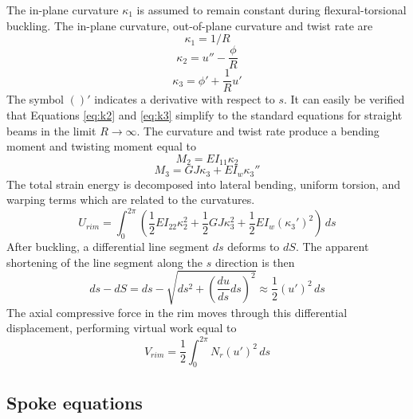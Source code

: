 \documentclass{bmd2016p}
\begin{document}
The in-plane curvature $\kappa_1$ is assumed to remain constant during flexural-torsional buckling. The in-plane curvature, out-of-plane curvature and twist rate are
\begin{equation}\label{eq:k1}
\kappa_1 = 1/R
\end{equation}
\begin{equation}\label{eq:k2}
\kappa_2 = u'' - \frac{\phi}{R}
\end{equation}
\begin{equation}\label{eq:k3}
\kappa_3 = \phi' + \frac{1}{R} u'
\end{equation}
The symbol $()'$ indicates a derivative with respect to $s$. It can easily be verified that Equations \ref{eq:k2} and \ref{eq:k3} simplify to the standard equations for straight beams in the limit $R\rightarrow \infty$. The curvature and twist rate produce a bending moment and twisting moment equal to
\begin{equation}\label{eq:M2}
M_2 = EI_{11} \kappa_2
\end{equation}
\begin{equation}\label{eq:M3}
M_3 = GJ \kappa_3 + EI_w \kappa_3''
\end{equation}
The total strain energy is decomposed into lateral bending, uniform torsion, and warping terms which are related to the curvatures.
\begin{equation}\label{eq:Urim}
U_{rim} = \int_0^{2\pi} \left( \frac{1}{2} EI_{22} \kappa_2^2 + \frac{1}{2} GJ \kappa_3^2 + \frac{1}{2} EI_w (\kappa_3')^2 \right)\, ds
\end{equation}
After buckling, a differential line segment $ds$ deforms to $dS$. The apparent shortening of the line segment along the $s$ direction is then
\begin{equation}\label{eq:ds}
ds - dS = ds - \sqrt{ds^2 + \left(\frac{du}{ds}ds\right)^2} \approx \frac{1}{2} (u')^2 \, ds
\end{equation}
The axial compressive force in the rim moves through this differential displacement, performing virtual work equal to
\begin{equation}\label{eq:Vrim}
V_{rim} = \frac{1}{2} \int_0^{2\pi} N_r (u')^2 \, ds
\end{equation}


\subsection{Spoke equations}
\end{document}
